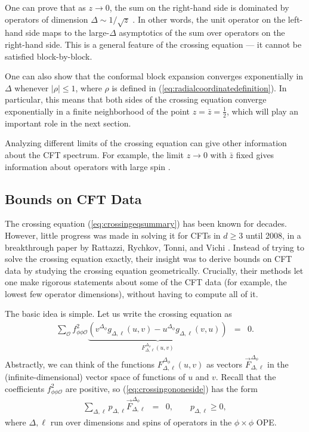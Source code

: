 \documentclass{ws-rv9x6}
\newcommand\be{\begin{eqnarray}}
\newcommand\ee{\end{eqnarray}}
\newcommand\f\phi
\newcommand\cO{\mathcal{O}}
\newcommand\p[1]{\left(#1\right)}
\newcommand\<\langle
\renewcommand\>\rangle
\renewcommand\.{\cdot}
\newcommand\x\times
\newcommand\De{\Delta}
\begin{document}
One can prove that as $z\to 0$, the sum on the right-hand side is dominated by operators of dimension $\Delta\sim 1/\sqrt z$ \cite{Pappadopulo:2012jk}.  In other words, the unit operator on the left-hand side maps to the large-$\De$ asymptotics of the sum over operators on the right-hand side.  This is a general feature of the crossing equation --- it cannot be satisfied block-by-block.

One can also show \cite{Pappadopulo:2012jk} that the conformal block expansion converges exponentially in $\De$ whenever $|\rho|\leq 1$, where $\rho$ is defined in (\ref{eq:radialcoordinatedefinition}).  In particular, this means that both sides of the crossing equation converge exponentially in a finite neighborhood of the point $z=\bar z=\frac 1 2$, which will play an important role in the next section.

Analyzing different limits of the crossing equation can give other information about the CFT spectrum.  For example, the limit $z\to 0$ with $\bar z$ fixed gives information about operators with large spin \cite{Alday:2007mf,Fitzpatrick:2012yx,Komargodski:2012ek,Alday:2015ewa}.

\subsection{Bounds on CFT Data}
\label{sec:bounds}

The crossing equation (\ref{eq:crossingeqsummary}) has been known for decades.  However, little progress was made in solving it for CFTs in $d\geq 3$ until 2008, in a breakthrough paper by Rattazzi, Rychkov, Tonni, and Vichi \cite{Rattazzi:2008pe}.  Instead of trying to solve the crossing equation exactly, their insight was to derive bounds on CFT data by studying the crossing equation geometrically.  Crucially, their methods let one make rigorous statements about some of the CFT data (for example, the lowest few operator dimensions), without having to compute all of it.

The basic idea is simple.  Let us write the crossing equation as
\be
\label{eq:crossingononeside}
\sum_\cO f_{\f\f\cO}^2 \underbrace{\p{v^{\De_\f}g_{\De,\ell}(u,v)-u^{\De_\f} g_{\De,\ell}(v,u)}}_{F_{\De,\ell}^{\De_\f}(u,v)} &=& 0.
\ee
Abstractly, we can think of the functions $F_{\De,\ell}^{\De_\f}(u,v)$ as vectors $\vec{F}_{\De,\ell}^{\De_\f}$ in the (infinite-dimensional) vector space of functions of $u$ and $v$.  Recall that the coefficients $f_{\f\f\cO}^2$ are positive, so (\ref{eq:crossingononeside}) has the form
\be
\label{eq:abstractcrossingeq}
\sum_{\De,\ell} p_{\De,\ell} \vec{F}_{\De,\ell}^{\De_\f} &=& 0,\qquad p_{\De,\ell}\geq 0,
\ee
where $\De,\ell$ run over dimensions and spins of operators in the $\f\x\f$ OPE.  
\end{document}

